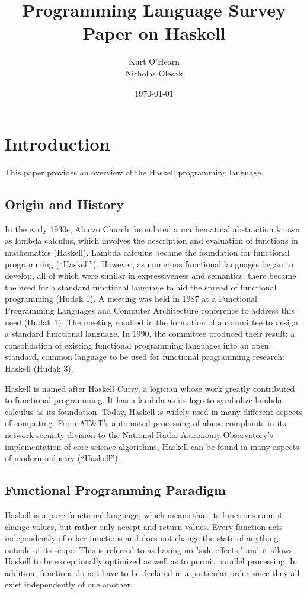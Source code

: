 \documentclass[titlepage,12pt]{article}
\title{Programming Language Survey Paper on Haskell}
\author{
        Kurt O'Hearn\\
        Nicholas Olesak\\
}
\date{\today}
\begin{document}
\maketitle 
\setcounter{tocdepth}{3}
\tableofcontents \newpage

\section{Introduction}
This paper provides an overview of the Haskell programming language.

\subsection{Origin and History}

In the early 1930s, Alonzo Church formulated a mathematical abstraction known as lambda calculus, which involves the description and evaluation of functions in mathematics (Haskell). Lambda calculus became the foundation for functional programming (``Haskell''). However, as numerous functional languages began to develop, all of which were similar in expressiveness and semantics, there became the need for a standard functional language to aid the spread of functional programming (Hudak 1). A meeting was held in 1987 at a Functional Programming Languages and Computer Architecture conference to address this need (Hudak 1). The meeting resulted in the formation of a committee to design a standard functional language. In 1990, the committee produced their result: a consolidation of existing functional programming languages into an open standard, common language to be used for functional programming research: Haskell (Hudak 3).

Haskell is named after Haskell Curry, a logician whose work greatly contributed to functional programming. It has a lambda as its logo to symbolize lambda calculus as its foundation. Today, Haskell is widely used in many different aspects of computing. From AT\&T's automated processing of abuse complaints in its network security division to the National Radio Astronomy Observatory’s implementation of core science algorithms, Haskell can be found in many aspects of modern industry (``Haskell''). 

\subsection{Functional Programming Paradigm}

Haskell is a pure functional language, which means that its functions cannot change values, but rather only accept and return values. Every function acts independently of other functions and does not change the state of anything outside of its scope. This is referred to as having no "side-effects," and it allows Haskell to be exceptionally optimized as well as to permit parallel processing. In addition, functions do not have to be declared in a particular order since they all exist independently of one another. 
\end{document}
